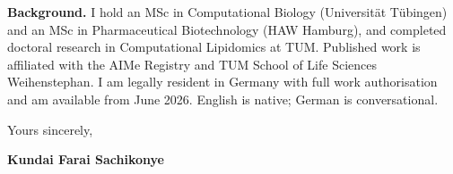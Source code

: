 \documentclass[12pt,a4paper]{article}
\begin{document}
\textbf{Background.}
I hold an MSc in Computational Biology (Universität Tübingen) and an MSc in
Pharmaceutical Biotechnology (HAW Hamburg), and completed doctoral research
in Computational Lipidomics at TUM. Published work is affiliated with the AIMe
Registry and TUM School of Life Sciences Weihenstephan. I am legally resident
in Germany with full work authorisation and am available from June 2026.
English is native; German is conversational.

\vspace{1.5em}
Yours sincerely,

\vspace{2.5em}
\textbf{Kundai Farai Sachikonye}
\end{document}
